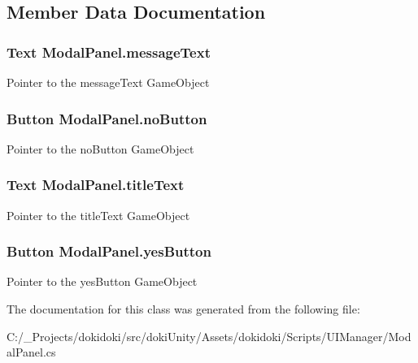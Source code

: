 \subsection{Member Data Documentation}
\subsubsection[{\texorpdfstring{message\+Text}{messageText}}]{\setlength{\rightskip}{0pt plus 5cm}Text Modal\+Panel.\+message\+Text}\hypertarget{class_modal_panel_aa0f1e1e45589f671cba12b0f05647a77}{}\label{class_modal_panel_aa0f1e1e45589f671cba12b0f05647a77}


Pointer to the message\+Text Game\+Object 

\subsubsection[{\texorpdfstring{no\+Button}{noButton}}]{\setlength{\rightskip}{0pt plus 5cm}Button Modal\+Panel.\+no\+Button}\hypertarget{class_modal_panel_a87f88998d90ba4c3c07bd7fb9aac6d58}{}\label{class_modal_panel_a87f88998d90ba4c3c07bd7fb9aac6d58}


Pointer to the no\+Button Game\+Object 

\subsubsection[{\texorpdfstring{title\+Text}{titleText}}]{\setlength{\rightskip}{0pt plus 5cm}Text Modal\+Panel.\+title\+Text}\hypertarget{class_modal_panel_a372eb52ee36c5bd204ca4659bc0f2e8c}{}\label{class_modal_panel_a372eb52ee36c5bd204ca4659bc0f2e8c}


Pointer to the title\+Text Game\+Object 

\subsubsection[{\texorpdfstring{yes\+Button}{yesButton}}]{\setlength{\rightskip}{0pt plus 5cm}Button Modal\+Panel.\+yes\+Button}\hypertarget{class_modal_panel_ad03ef3b69d09cf3c4b6a9d309bb7401d}{}\label{class_modal_panel_ad03ef3b69d09cf3c4b6a9d309bb7401d}


Pointer to the yes\+Button Game\+Object 



The documentation for this class was generated from the following file\+:\begin{DoxyCompactItemize}
\item 
C\+:/\+\_\+\+Projects/dokidoki/src/doki\+Unity/\+Assets/dokidoki/\+Scripts/\+U\+I\+Manager/Modal\+Panel.\+cs\end{DoxyCompactItemize}

